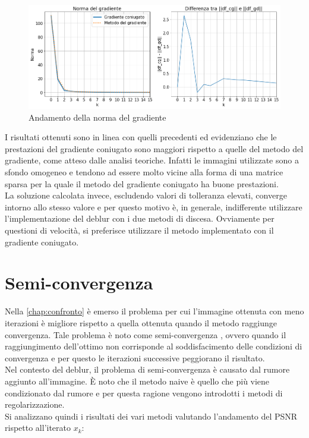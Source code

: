 \documentclass[11pt]{article}
\begin{document}
\begin{figure}[H]
    \centering
    \includegraphics[width=14cm]{iterazioni_cg_gd/2/norma_gradiente.png}
    \caption{Andamento della norma del gradiente}
    \label{fig:gradiente2}
\end{figure}

I risultati ottenuti sono in linea con quelli precedenti ed evidenziano che le prestazioni del gradiente coniugato sono maggiori rispetto a quelle del metodo del gradiente, 
come atteso dalle analisi teoriche. Infatti le immagini utilizzate sono a sfondo omogeneo e tendono ad essere molto vicine alla forma di una matrice sparsa per la quale il metodo del gradiente coniugato ha buone prestazioni.\\
La soluzione calcolata invece, escludendo valori di tolleranza elevati, converge intorno allo stesso valore e per questo motivo è, in generale, indifferente utilizzare l'implementazione del deblur con i due metodi di discesa. Ovviamente per questioni di velocità, si preferisce utilizzare il metodo implementato con il gradiente coniugato.



\newpage
\section{Semi-convergenza}
\label{chap:semiconv}
Nella \autoref{chap:confronto} è emerso il problema per cui l'immagine ottenuta con meno iterazioni è migliore rispetto a quella ottenuta quando il metodo raggiunge convergenza. 
Tale problema è noto come semi-convergenza \cite{1}\cite{2}\cite{3}, ovvero quando il raggiungimento dell'ottimo non corrisponde al soddisfacimento delle condizioni di convergenza e per questo le iterazioni successive peggiorano il risultato.\\
Nel contesto del deblur, il problema di semi-convergenza è causato dal rumore aggiunto all'immagine. È noto che il metodo naive è quello che più viene condizionato dal rumore e per questa ragione vengono introdotti i metodi di regolarizzazione.\\
Si analizzano quindi i risultati dei vari metodi valutando l'andamento del PSNR rispetto all'iterato $x_{k}$:
\end{document}
